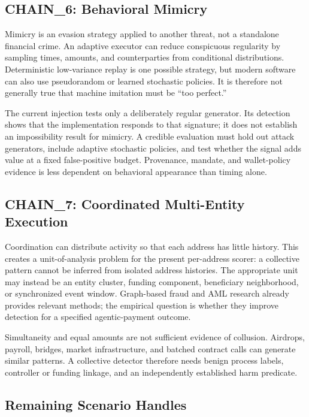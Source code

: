 \subsection{CHAIN\_6: Behavioral Mimicry}\label{subsec:chain6}

Mimicry is an evasion strategy applied to another threat, not a standalone
financial crime.  An adaptive executor can reduce conspicuous regularity by
sampling times, amounts, and counterparties from conditional distributions.
Deterministic low-variance replay is one possible strategy, but modern software
can also use pseudorandom or learned stochastic policies.  It is therefore not
generally true that machine imitation must be ``too perfect.''

The current injection tests only a deliberately regular generator.  Its
detection shows that the implementation responds to that signature; it does
not establish an impossibility result for mimicry.  A credible evaluation must
hold out attack generators, include adaptive stochastic policies, and test
whether the signal adds value at a fixed false-positive budget.  Provenance,
mandate, and wallet-policy evidence is less dependent on behavioral appearance
than timing alone.

\subsection{CHAIN\_7: Coordinated Multi-Entity Execution}\label{subsec:chain7}

Coordination can distribute activity so that each address has little history.
This creates a unit-of-analysis problem for the present per-address scorer: a
collective pattern cannot be inferred from isolated address histories.  The
appropriate unit may instead be an entity cluster, funding component,
beneficiary neighborhood, or synchronized event window.  Graph-based fraud and
AML research already provides relevant methods\cite{pourhabibi2020,wei2021};
the empirical question is whether they improve detection for a specified
agentic-payment outcome.

Simultaneity and equal amounts are not sufficient evidence of collusion.
Airdrops, payroll, bridges, market infrastructure, and batched contract calls
can generate similar patterns.  A collective detector therefore needs benign
process labels, controller or funding linkage, and an independently established
harm predicate.

\subsection{Remaining Scenario Handles}\label{subsec:chains_other}

